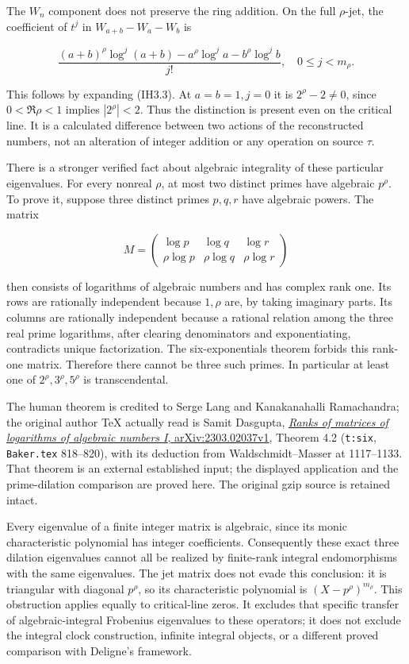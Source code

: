 The \(W_n\) component does not preserve the ring addition. On the full
\(\rho\)-jet, the coefficient of \(t^j\) in \(W_{a+b}-W_a-W_b\) is

\[
\frac{(a+b)^\rho\log^j(a+b)-a^\rho\log^j a-b^\rho\log^j b}{j!},
\quad0\le j<m_\rho.
\tag{IH5.2}
\]

This follows by expanding (IH3.3). At \(a=b=1,j=0\) it is
\(2^\rho-2\ne0\), since \(0<\Re\rho<1\) implies \(|2^\rho|<2\). Thus the
distinction is present even on the critical line. It is a calculated
difference between two actions of the reconstructed numbers, not an
alteration of integer addition or any operation on source \(\tau\).

There is a stronger verified fact about algebraic integrality of these
particular eigenvalues. For every nonreal \(\rho\), at most two distinct
primes have algebraic \(p^\rho\). To prove it, suppose three distinct
primes \(p,q,r\) have algebraic powers. The matrix

\[
M=\begin{pmatrix}\log p&\log q&\log r\\
\rho\log p&\rho\log q&\rho\log r\end{pmatrix}
\tag{IH5.3}
\]

then consists of logarithms of algebraic numbers and has complex rank
one. Its rows are rationally independent because \(1,\rho\) are, by
taking imaginary parts. Its columns are rationally independent because a
rational relation among the three real prime logarithms, after clearing
denominators and exponentiating, contradicts unique factorization. The
six-exponentials theorem forbids this rank-one matrix. Therefore there
cannot be three such primes. In particular at least one of
\(2^\rho,3^\rho,5^\rho\) is transcendental.

The human theorem is credited to Serge Lang and Kanakanahalli
Ramachandra; the original author TeX actually read is Samit Dasgupta,
\href{https://arxiv.org/abs/2303.02037v1}{\emph{Ranks of matrices of
logarithms of algebraic numbers I}, arXiv:2303.02037v1}, Theorem 4.2
(\texttt{t:six}, \nolinkurl{Baker.tex} 818--820), with its deduction from
Waldschmidt--Masser at 1117--1133. That theorem is an external
established input; the displayed application and the prime-dilation
comparison are proved here. The original gzip source is retained intact.

Every eigenvalue of a finite integer matrix is algebraic, since its
monic characteristic polynomial has integer coefficients. Consequently
these exact three dilation eigenvalues cannot all be realized by
finite-rank integral endomorphisms with the same eigenvalues. The jet
matrix does not evade this conclusion: it is triangular with diagonal
\(p^\rho\), so its characteristic polynomial is \((X-p^\rho)^{m_\rho}\).
This obstruction applies equally to critical-line zeros. It excludes
that specific transfer of algebraic-integral Frobenius eigenvalues to
these operators; it does not exclude the integral clock construction,
infinite integral objects, or a different proved comparison with
Deligne's framework.

